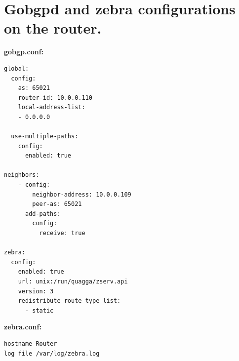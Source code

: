 \section{Gobgpd and zebra configurations on the router.}

{\bf\normalsize gobgp.conf:}
\begin{verbatim}
global:
  config:
    as: 65021
    router-id: 10.0.0.110
    local-address-list:
    - 0.0.0.0

  use-multiple-paths:
    config:
      enabled: true

neighbors:
    - config:
        neighbor-address: 10.0.0.109
        peer-as: 65021
      add-paths:
        config:
          receive: true

zebra:
  config:
    enabled: true
    url: unix:/run/quagga/zserv.api
    version: 3
    redistribute-route-type-list: 
      - static

\end{verbatim}
\label{appendix:router_config}
%
{\bf\normalsize zebra.conf:}
\begin{verbatim}
hostname Router
log file /var/log/zebra.log
\end{verbatim}



